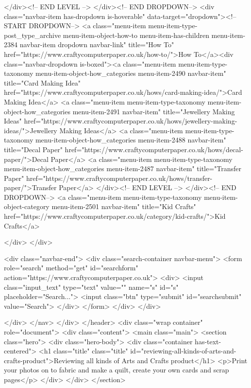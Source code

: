 </div><!-- END LEVEL -->
</div><!-- END DROPDOWN-->
<div class="navbar-item has-dropdown is-hoverable" data-target="dropdown"><!-- START DROPDOWN-->
<a class="menu-item menu-item-type-post_type_archive menu-item-object-how-to menu-item-has-children menu-item-2384 navbar-item dropdown navbar-link" title="How To" href="https://www.craftycomputerpaper.co.uk/how-to/">How To</a><div class="navbar-dropdown is-boxed"><a class="menu-item menu-item-type-taxonomy menu-item-object-how_categories menu-item-2490 navbar-item" title="Card Making Idea" href="https://www.craftycomputerpaper.co.uk/hows/card-making-idea/">Card Making Idea</a>
<a class="menu-item menu-item-type-taxonomy menu-item-object-how_categories menu-item-2491 navbar-item" title="Jewellery Making Ideas" href="https://www.craftycomputerpaper.co.uk/hows/jewellery-making-ideas/">Jewellery Making Ideas</a>
<a class="menu-item menu-item-type-taxonomy menu-item-object-how_categories menu-item-2488 navbar-item" title="Decal Paper" href="https://www.craftycomputerpaper.co.uk/hows/decal-paper/">Decal Paper</a>
<a class="menu-item menu-item-type-taxonomy menu-item-object-how_categories menu-item-2487 navbar-item" title="Transfer Paper" href="https://www.craftycomputerpaper.co.uk/hows/transfer-paper/">Transfer Paper</a>
</div><!-- END LEVEL -->
</div><!-- END DROPDOWN-->
<a class="menu-item menu-item-type-taxonomy menu-item-object-category menu-item-2501 navbar-item" title="Kid Crafts" href="https://www.craftycomputerpaper.co.uk/category/kid-crafts/">Kid Crafts</a>

                  </div>
      </div>

      <div class="navbar-end">
        <div class="search-container navbar-menu">
          <form role="search" method="get" id="searchform" action="https://www.craftycomputerpaper.co.uk">
              <div>
                  <input class="input_text" type="text" value="" name="s" id="s" placeholder="Search...">
                  <input class="btn" type="submit" id="searchsubmit" value="Search">
              </div>
          </form>
        </div>
      </div>

      </div>
    </nav>
  </div>
</header>
    <div class="wrap container" role="document">
      <div class="content">
        <main class="main">
                 <section class="hero">
  <div class="hero-body">
    <div class="container has-text-centered">
    <h1 class="title" class="title" id="reviewing-all-kinds-of-arts-and-crafts-product">Reviewing all kinds of Arts and Crafts product</h1>
<p>Print your photos on to fabric and make a quilt, create your own cards and scrap pages</p>
    </div>
  </div>
</section>

